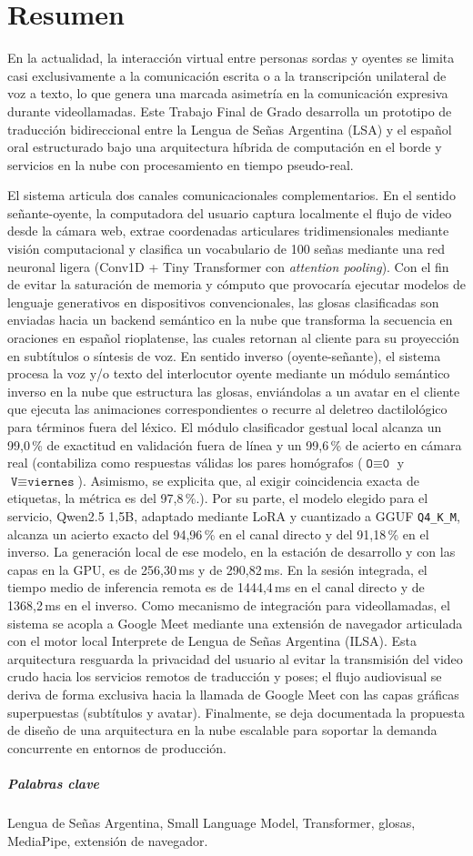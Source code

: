 
\chapter*{Resumen}
En la actualidad, la interacción virtual entre personas sordas y oyentes se limita casi exclusivamente a la comunicación escrita o a la transcripción unilateral de voz a texto, lo que genera una marcada 
asimetría en la comunicación expresiva durante videollamadas. Este Trabajo Final de Grado desarrolla un prototipo de traducción bidireccional entre la Lengua de Señas Argentina (LSA) y el español oral 
estructurado bajo una arquitectura híbrida de computación en el borde y servicios en la nube con procesamiento en tiempo pseudo-real.

El sistema articula dos canales comunicacionales complementarios. En el sentido señante-oyente, la computadora del usuario captura localmente el flujo de video desde la cámara web, extrae coordenadas 
articulares tridimensionales mediante visión computacional y clasifica un vocabulario de 100 señas mediante una red neuronal ligera (Conv1D + Tiny Transformer con \textit{attention pooling}). Con el fin de evitar 
la saturación de memoria y cómputo que provocaría ejecutar modelos de lenguaje generativos en dispositivos convencionales, las glosas clasificadas son enviadas hacia un backend semántico en la nube que 
transforma la secuencia en oraciones en español rioplatense, las cuales retornan al cliente para su proyección en subtítulos o síntesis de voz. En sentido inverso (oyente-señante), el sistema procesa 
la voz y/o texto del interlocutor oyente mediante un módulo semántico inverso en la nube que estructura las glosas, enviándolas a un avatar en el cliente que ejecuta las animaciones correspondientes o 
recurre al deletreo dactilológico para términos fuera del léxico.
El módulo clasificador gestual local alcanza un 99{,}0\,\% de exactitud en validación fuera de línea y un 99{,}6\,\% de acierto en cámara real (contabiliza como respuestas válidas los pares homógrafos ($\texttt{O} \equiv \texttt{0}$ y $\texttt{V} \equiv \texttt{viernes}$). Asimismo, se explicita que, al exigir coincidencia exacta de etiquetas, la métrica es del 97{,}8\,\%.). Por su parte, el modelo elegido para el servicio, Qwen2.5 1,5B, adaptado mediante LoRA y cuantizado a GGUF \texttt{Q4\_K\_M}, alcanza un acierto exacto del 94,96\,\% en el canal directo y del 91,18\,\% en el inverso. La generación local de ese modelo, en la estación de desarrollo y con las capas en la GPU, es de 256,30\,ms y de 290,82\,ms. En la sesión integrada, el tiempo medio de inferencia remota es de 1444,4\,ms en el canal directo y de 1368,2\,ms en el inverso.
Como mecanismo de integración para videollamadas, el sistema se acopla a Google Meet mediante una extensión de navegador articulada con el motor local Interprete de Lengua de Señas Argentina (ILSA). Esta arquitectura resguarda la privacidad del usuario al evitar la transmisión del video crudo hacia los servicios remotos de traducción y poses; el flujo audiovisual se deriva de forma exclusiva hacia la llamada de Google Meet con las capas gráficas superpuestas (subtítulos y avatar). Finalmente, se deja documentada la propuesta de diseño de una arquitectura en la nube escalable para soportar la demanda concurrente en entornos de producción.

\paragraph{Palabras clave} 
Lengua de Señas Argentina, Small Language Model, Transformer, glosas, MediaPipe, extensión de navegador.